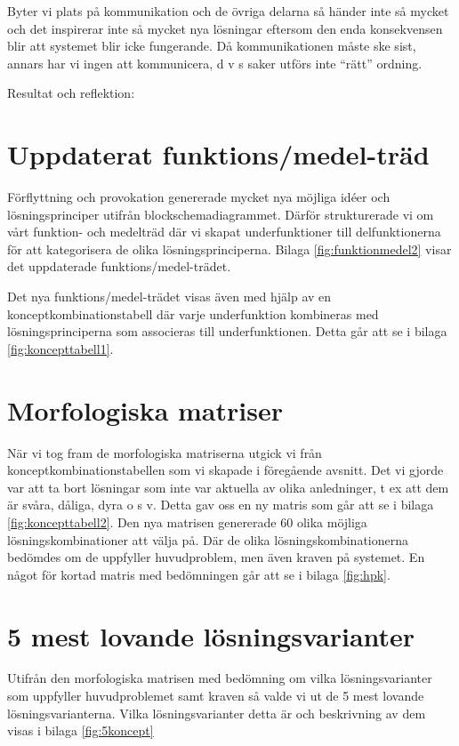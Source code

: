 \documentclass[11pt, a4paper]{report}
\begin{document}
Byter vi plats på kommunikation och de övriga delarna så händer inte så mycket och det inspirerar inte så mycket nya lösningar eftersom den enda konsekvensen blir att systemet blir icke fungerande. Då kommunikationen måste ske sist, annars har vi ingen att kommunicera, d v s saker utförs inte “rätt” ordning.

Resultat och reflektion:



\section{Uppdaterat funktions/medel-träd}

Förflyttning och provokation genererade mycket nya möjliga idéer och lösningsprinciper utifrån blockschemadiagrammet. Därför strukturerade vi om vårt funktion- och medelträd där vi skapat underfunktioner till delfunktionerna för att kategorisera de olika lösningsprinciperna. Bilaga \ref{fig:funktionmedel2} visar det uppdaterade funktions/medel-trädet.

Det nya funktions/medel-trädet visas även med hjälp av en konceptkombinationstabell där varje underfunktion kombineras med lösningsprinciperna som associeras till underfunktionen. Detta går att se i bilaga \ref{fig:koncepttabell1}.


\section{Morfologiska matriser}

När vi tog fram de morfologiska matriserna utgick vi från konceptkombinationstabellen som vi skapade i föregående avsnitt. Det vi gjorde var att ta bort lösningar som inte var aktuella av olika anledninger, t ex att dem är svåra, dåliga, dyra o s v. Detta gav oss en ny matris som går att se i bilaga \ref{fig:koncepttabell2}. Den nya matrisen genererade 60 olika möjliga lösningskombinationer att välja på. Där de olika lösningskombinationerna bedömdes om de uppfyller huvudproblem, men även kraven på systemet. En något för kortad matris med bedömningen går att se i bilaga \ref{fig:hpk}.

\section{5 mest lovande lösningsvarianter}

Utifrån den morfologiska matrisen med bedömning om vilka lösningsvarianter som uppfyller huvudproblemet samt kraven så valde vi ut de 5 mest lovande lösningsvarianterna. Vilka lösningsvarianter detta är och beskrivning av dem visas i bilaga \ref{fig:5koncept}
\end{document}
